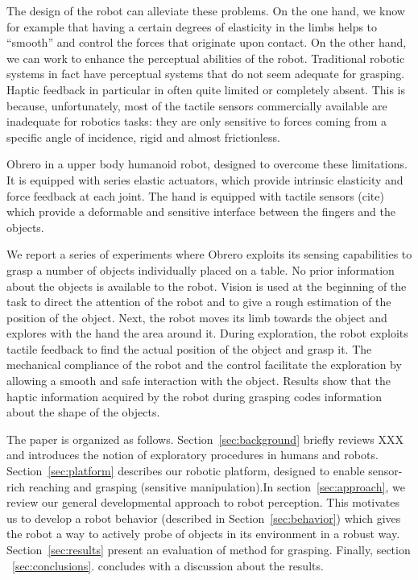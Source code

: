The design of the robot can alleviate these problems. On the one hand, we know
for example that having a certain degrees of elasticity in the limbs helps to
``smooth''  and control the forces that originate upon contact.
On the other hand, we can work to enhance the perceptual abilities of the robot.
Traditional robotic systems in fact have perceptual systems that do not seem
adequate for grasping. Haptic feedback in particular in often quite limited or
completely absent. This is because, unfortunately, most of the tactile
sensors commercially available are inadequate for robotics tasks: they are only
sensitive to forces coming from a specific angle of incidence, rigid
and almost frictionless.

Obrero\cite{obrero} in a upper body humanoid robot, designed to overcome these
limitations. It is equipped with series elastic actuators,
which provide intrinsic elasticity and force feedback at each joint. The hand
is equipped with tactile sensors (cite) which provide a deformable and sensitive
interface between the fingers and the objects.

We report a series of experiments where Obrero exploits its
sensing capabilities to grasp a number of objects individually
placed on a table. No prior information about the objects is
available to the robot. Vision is used at the beginning of the
task to direct the attention of the robot and to give a rough
estimation of the position of the object. Next, the robot moves
its limb towards the object and explores with the hand the area
around it. During exploration, the robot exploits tactile feedback
to find the actual position of the object and grasp it. The
mechanical compliance of the robot and the control facilitate the
exploration by allowing a smooth and safe interaction with the
object. Results show that the haptic information acquired by
the robot during grasping codes information about the shape of
the objects.

The paper is organized as follows. Section~\ref{sec:background}
briefly reviews XXX and introduces the notion of exploratory
procedures in humans and robots. Section~\ref{sec:platform}
describes our robotic platform, designed to enable sensor-rich
reaching and grasping (sensitive manipulation).In
section~\ref{sec:approach}, we review our general developmental
approach to robot perception. This motivates us to develop a robot
behavior (described in Section~\ref{sec:behavior}) which gives the
robot a way to actively probe of objects in its environment in a
robust way. Section~\ref{sec:results} present an evaluation of
method for grasping. Finally, section ~\ref{sec:conclusions}.
concludes with a discussion about the results.
